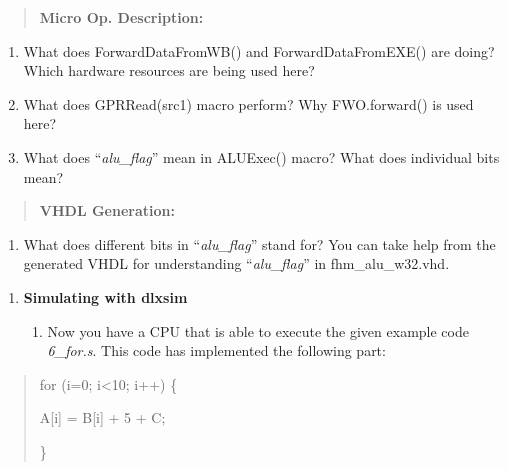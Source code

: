 \documentclass[
]{article}
\begin{document}
\begin{quote}
\textbf{Micro Op. Description:}
\end{quote}

\begin{enumerate}
\def\labelenumi{\alph{enumi})}
\setcounter{enumi}{7}
\item
  What does ForwardDataFromWB() and ForwardDataFromEXE() are doing?
  Which hardware resources are being used here?
\item
  What does GPRRead(src1) macro perform? Why FWO.forward() is used here?
\item
  What does ``\emph{alu\_flag}'' mean in ALUExec() macro? What does
  individual bits mean?
\end{enumerate}

\begin{quote}
\textbf{VHDL Generation:}
\end{quote}

\begin{enumerate}
\def\labelenumi{\alph{enumi})}
\setcounter{enumi}{10}
\item
  What does different bits in ``\emph{alu\_flag}'' stand for? You can
  take help from the generated VHDL for understanding
  ``\emph{alu\_flag}'' in fhm\_alu\_w32.vhd.
\end{enumerate}

\begin{enumerate}
\def\labelenumi{\arabic{enumi}.}
\setcounter{enumi}{3}
\item
  \textbf{Simulating with dlxsim}

  \begin{enumerate}
  \def\labelenumii{\arabic{enumii}.}
  \item
    Now you have a CPU that is able to execute the given example code
    \emph{6\_for.s}. This code has implemented the following part:
  \end{enumerate}
\end{enumerate}

\begin{quote}
for (i=0; i\textless10; i++) \{

A{[}i{]} = B{[}i{]} + 5 + C;

\}
\end{quote}
\end{document}
